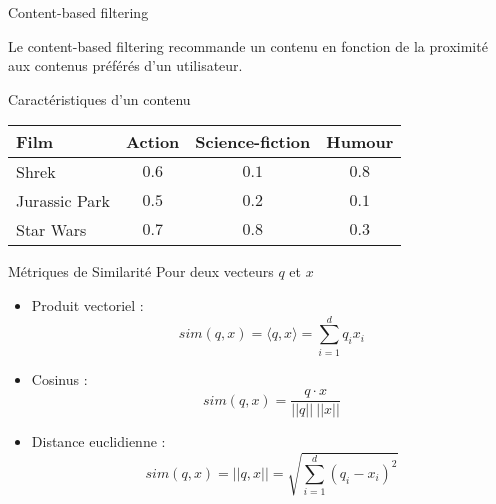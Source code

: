 \begin{frame}{Content-based filtering}
  \begin{minipage}{0.49\linewidth}
    Le \alert{content-based filtering} recommande un contenu en fonction de la proximité aux contenus préférés d'un utilisateur.
  \end{minipage}
  \begin{minipage}{0.49\linewidth}
  \end{minipage}
\end{frame}

\begin{frame}{Caractéristiques d'un contenu}
  \centering
  \begin{tabular}{|l|c|c|c|}
    \toprule
    Film & Action & Science-fiction & Humour\\
    \midrule
    Shrek & $0.6$ & $0.1$ & $0.8$\\
    \midrule
    Jurassic Park & $0.5$ & $0.2$ & $0.1$\\
    \midrule
    Star Wars & $0.7$ & $0.8$ & $0.3$\\
    \bottomrule
  \end{tabular}
\end{frame}

\begin{frame}{Métriques de Similarité}
  \label{contentbasedf:metrics}
  Pour deux  vecteurs $q$ et $x$
  \begin{itemize}
    \item Produit vectoriel :
    $$sim(q,x) = \langle q,x\rangle = \sum^d_{i=1}q_i x_i$$
    \item Cosinus : 
     $$sim(q,x) = \frac{q\cdot x}{||q||\ ||x||}$$
    \item Distance euclidienne :
     $$sim(q,x) = ||q,x|| = \sqrt{\sum^d_{i=1}(q_i-x_i)^2}$$
  \end{itemize}
\end{frame}

